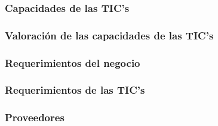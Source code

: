 \subsubsection{Capacidades de las TIC’s }
\subsubsection{Valoración de las capacidades de las TIC’s }
\subsubsection{Requerimientos del negocio}
\subsubsection{Requerimientos de las TIC’s}
\subsubsection{Proveedores }
